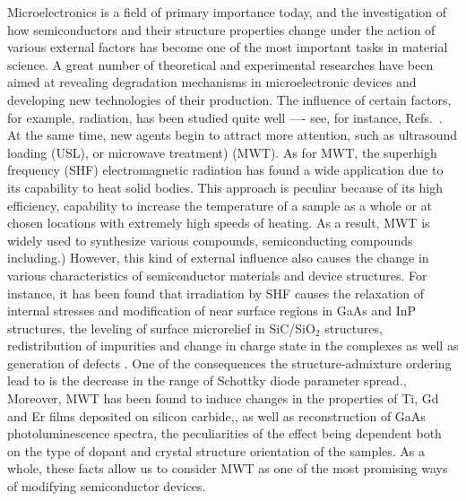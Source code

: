 \documentclass[%
 aip,jap,
 amsmath,amssymb,
 reprint,%
]{revtex4-1}
\begin{document}
Microelectronics is a field of primary importance today, and the investigation of how semiconductors and their structure properties change under the action of various external factors has become one of the most important tasks in material science.
A great number of theoretical and experimental researches have been aimed at revealing degradation mechanisms in microelectronic devices and developing new technologies of their production.
The influence of certain factors, for example, radiation, has been studied quite well ---- see, for instance, Refs.~.
At the same time, new agents begin to attract more attention, such as ultrasound loading\cite{Olikh2018JAP,Olikh2006TPL} (USL),
or microwave treatment\cite{MW:Rev,ZOHM2000,BHUNIA1998,Bacherikov2003En,Pashkov1994En,
BoltovetsEn,Milenin1994En,BelyaevIntac,ASHKINADZE1996,ProcSPIE,Belyaev1998JTFEn,
Bacherikov2008En,Konakova2015En,Konakova2012FTPEn}) (MWT).
As for MWT, the superhigh frequency (SHF) electromagnetic radiation has found a wide application due to its capability to heat solid bodies\cite{MW:Rev,ZOHM2000}.
This approach is peculiar because of its high efficiency, capability to increase the temperature
of a sample as a whole or at chosen locations with extremely high speeds of heating\cite{MW:Rev}.
As a result, MWT is widely used to synthesize various compounds, semiconducting compounds including.\cite{MW:Rev,BHUNIA1998})
However, this kind of external influence also causes the change in various characteristics of semiconductor materials and device structures.
For instance, it has been found that irradiation by  SHF causes the relaxation of internal stresses and modification of near surface regions
in GaAs and InP structures, \cite{BoltovetsEn,Pashkov1994En,Milenin1994En,BelyaevIntac,ProcSPIE,Konakova2015En,Konakova2012FTPEn}
the leveling of surface microrelief in SiC/SiO$_2$ structures,\cite{Bacherikov2003En}
redistribution of impurities\cite{Bacherikov2003En,Belyaev1998JTFEn,Konakova2015En}
and change in charge state in the complexes\cite{Milenin1994En} as well as generation of defects \cite{Belyaev1998JTFEn}.
One of the consequences the structure-admixture ordering  lead to is the decrease in the range of
Schottky diode parameter spread.\cite{Milenin1994En},\cite{Belyaev1998JTFEn}
Moreover, MWT has been found to induce changes in the properties of Ti, Gd and Er films deposited on silicon carbide,\cite{Bacherikov2008En},
as well as reconstruction of GaAs photoluminescence spectra, \cite{BelyaevIntac,ProcSPIE,Belyaev1998JTFEn}
the peculiarities of the effect being dependent both on the type of dopant and crystal structure orientation of the samples.
As a whole, these facts allow us to consider MWT as one of the most promising ways of modifying semiconductor devices.
\end{document}
